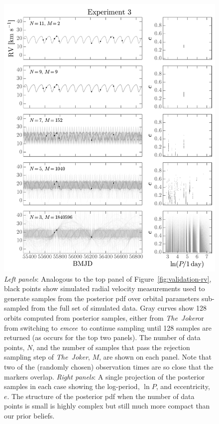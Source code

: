 \documentclass[manuscript, letterpaper]{aastex6}
\newcommand{\project}[1]{\textsl{#1}}
\newcommand{\samplername}{\project{The~Joker}}
\newcommand{\emcee}{\project{emcee}}
\newcommand{\figname}{Figure}
\begin{document}
\begin{figure}[p]
\begin{center}
\includegraphics[width=\textwidth]{figures/numpts-rv-curves.pdf}
\end{center}
\caption{%
{\sl Left panels}: Analogous to the top panel of
\figname~\ref{fig:validation-rv}, black points show simulated radial velocity
measurements used to generate samples from the posterior pdf over orbital
parameters sub-sampled from the full set of simulated data.
Gray curves show 128 orbits computed from posterior samples, either from
\samplername or from switching to \emcee\ to continue sampling until 128 samples
are returned (as occurs for the top two panels).
The number of data points, $N$, and the number of samples that pass the
rejection sampling step of \samplername, $M$, are shown on each panel.
Note that two of the (randomly chosen) observation times are so close that the
markers overlap.
{\sl Right panels}: A single projection of the posterior samples in each case
showing the log-period, $\ln P$, and eccentricity, $e$.
The structure of the posterior pdf when the number of data points is small is
highly complex but still much more compact than our prior beliefs.
\label{fig:numpts-rv}}
\end{figure}
\end{document}
